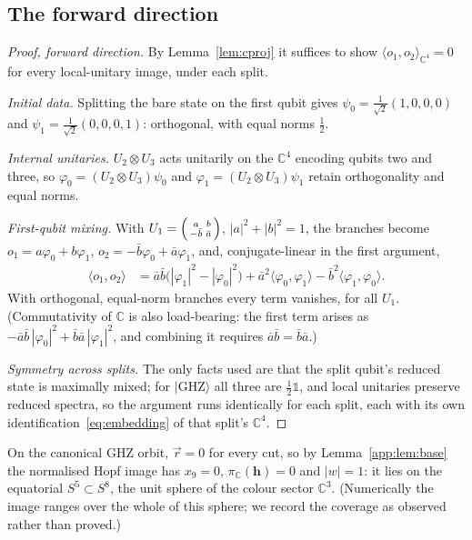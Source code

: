 \subsection{The forward direction}

\begin{proof}[Proof, forward direction]
By Lemma~\ref{lem:cproj} it suffices to show $\langle o_1,o_2\rangle_{\mathbb{C}^4} = 0$ for every
local-unitary image, under each split.

\emph{Initial data.} Splitting the bare state on the first qubit gives
$\psi_0 = \tfrac1{\sqrt2}(1,0,0,0)$ and $\psi_1 = \tfrac1{\sqrt2}(0,0,0,1)$: orthogonal, with equal
norms $\tfrac12$.

\emph{Internal unitaries.} $U_2\otimes U_3$ acts unitarily on the $\mathbb{C}^4$ encoding qubits two
and three, so $\varphi_0 = (U_2\otimes U_3)\psi_0$ and $\varphi_1 = (U_2\otimes U_3)\psi_1$ retain
orthogonality and equal norms.

\emph{First-qubit mixing.} With
$U_1 = \begin{psmallmatrix} a & b\\ -\bar b & \bar a\end{psmallmatrix}$, $|a|^2+|b|^2 = 1$, the
branches become $o_1 = a\varphi_0+b\varphi_1$, $o_2 = -\bar b\varphi_0+\bar a\varphi_1$, and,
conjugate-linear in the first argument,
\begin{align}
  \langle o_1,o_2\rangle
  &= \bar a\bar b\bigl(|\varphi_1|^2-|\varphi_0|^2\bigr)
   + \bar a^2\langle\varphi_0,\varphi_1\rangle
   - \bar b^2\langle\varphi_1,\varphi_0\rangle.
  \label{eq:general-ip}
\end{align}
With orthogonal, equal-norm branches every term vanishes, for all $U_1$. (Commutativity of
$\mathbb{C}$ is also load-bearing: the first term arises as
$-\bar a\bar b\,|\varphi_0|^2 + \bar b\bar a\,|\varphi_1|^2$, and combining it requires
$\bar a\bar b = \bar b\bar a$.)

\emph{Symmetry across splits.} The only facts used are that the split qubit's reduced state is
maximally mixed; for $\lvert\mathrm{GHZ}\rangle$ all three are $\tfrac12\mathbb{1}$, and local
unitaries preserve reduced spectra, so the argument runs identically for each split, each with its
own identification~\eqref{eq:embedding} of that split's $\mathbb{C}^4$.
\end{proof}

\begin{corollary}\label{app:cor:s5}
On the canonical GHZ orbit, $\vec r = 0$ for every cut, so by Lemma~\ref{app:lem:base} the
normalised Hopf image has $x_9 = 0$, $\pi_{\mathbb{C}}(\mathbf{h}) = 0$ and $|w| = 1$: it lies on
the equatorial $S^5\subset S^8$, the unit sphere of the colour sector $\mathbb{C}^3$. (Numerically
the image ranges over the whole of this sphere; we record the coverage as observed rather than
proved.)
\end{corollary}

